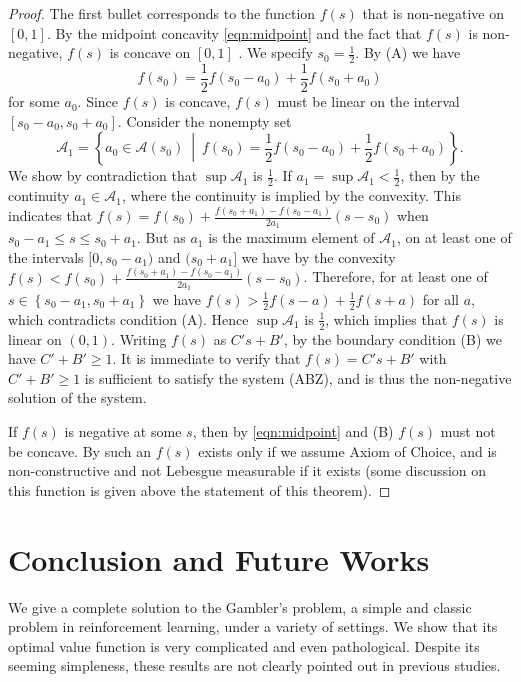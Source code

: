 \documentclass{article}
\theoremstyle{named}
\newcommand{\cA}{\mathcal{A}}
\newcommand{\set}[1]{\left\{#1\right\}}
\begin{document}
\begin{proof}
The first bullet corresponds to the function $f(s)$ that is non-negative on $[0,1]$. By the midpoint concavity \eqref{eqn:midpoint} and the fact that $f(s)$ is non-negative, $f(s)$ is concave on $[0,1]$ \citep{sierpinski1920equation,sierpinski1920fonctions}. We specify $s_0=\frac{1}{2}$. By (A) we have 
\[
f(s_0) = \frac{1}{2} f(s_0-a_0) + \frac{1}{2} f(s_0+a_0)
\]
for some $a_0$. Since $f(s)$ is concave, $f(s)$ must be linear on the interval $[s_0-a_0, s_0+a_0]$. Consider the nonempty set 
\[
\cA_{1} = \set{a_0\in\cA(s_0) \ \middle\vert\ f(s_0) = \frac{1}{2} f(s_0-a_0) + \frac{1}{2} f(s_0+a_0)}.
\]
We show by contradiction that $\sup \cA_{1}$ is $\frac{1}{2}$. If $a_1 = \sup \cA_{1}<\frac{1}{2}$, then by the continuity $a_1\in \cA_1$, where the continuity is implied by the convexity. This indicates that $f(s)=f(s_0) + \frac{f(s_0+a_1) - f(s_0-a_1)}{2a_1}(s-s_0)$ when $s_0-a_1\le s \le s_0+a_1$. But as $a_1$ is the maximum element of $\cA_1$, on at least one of the intervals $[0, s_0-a_1)$ and $(s_0+a_1]$ we have by the convexity $f(s)<f(s_0) + \frac{f(s_0+a_1) - f(s_0-a_1)}{2a_1}(s-s_0)$. Therefore, for at least one of $s\in\set{s_0-a_1, s_0+a_1}$ we have $f(s)>\frac{1}{2}f(s-a)+\frac{1}{2}f(s+a)$ for all $a$, which contradicts condition (A). Hence $\sup \cA_1$ is $\frac{1}{2}$, which implies that $f(s)$ is linear on $(0,1)$. Writing $f(s)$ as $C's+B'$, by the boundary condition (B) we have $C'+B'\ge 1$. It is immediate to verify that $f(s)=C's+B'$ with $C'+B'\ge 1$ is sufficient to satisfy the system (ABZ), and is thus the non-negative solution of the system.

If $f(s)$ is negative at some $s$, then by \eqref{eqn:midpoint} and (B) $f(s)$ must not be concave. By \citet{sierpinski1920equation,sierpinski1920fonctions} such an $f(s)$ exists only if we assume Axiom of Choice, and is non-constructive and not Lebesgue measurable if it exists (some discussion on this function is given above the statement of this theorem). 
\end{proof}

\section{Conclusion and Future Works}

We give a complete solution to the Gambler's problem, a simple and classic problem in reinforcement learning, under a variety of settings. We show that its optimal value function is very complicated and even pathological. Despite its seeming simpleness, these results are not clearly pointed out in previous studies.
\end{document}

